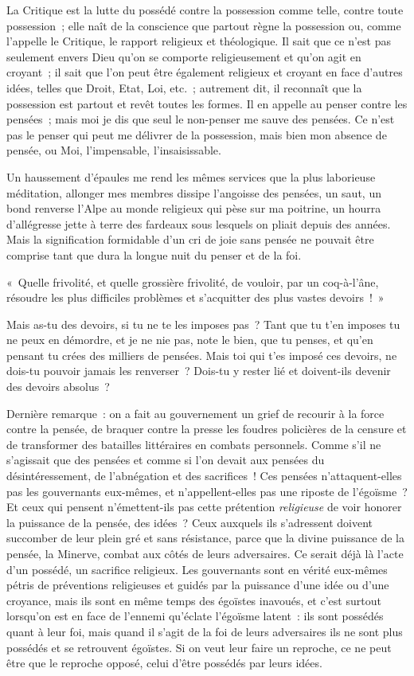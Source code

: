 \documentclass[french,twoside]{book} %
\begin{document}
La Critique est la lutte du possédé contre la possession comme telle, contre toute possession ; elle naît de la conscience que partout règne la possession ou, comme l’appelle le Critique, le rapport religieux et théologique. Il sait que ce n’est pas seulement envers Dieu qu’on se comporte religieusement et qu’on agit en croyant ; il sait que l’on peut être également religieux et croyant en face d’autres idées, telles que Droit, Etat, Loi, etc. ; autrement dit, il reconnaît que la possession est partout et revêt toutes les formes. Il en appelle au penser contre les pensées ; mais moi je dis que seul le non-penser me sauve des pensées. Ce n’est pas le penser qui peut me délivrer de la possession, mais bien mon absence de pensée, ou Moi, l’impensable, l’insaisissable.\par
Un haussement d’épaules me rend les mêmes services que la plus laborieuse méditation, allonger mes membres dissipe l’angoisse des pensées, un saut, un bond renverse l’Alpe au monde religieux qui pèse sur ma poitrine, un hourra d’allégresse jette à terre des fardeaux sous lesquels on pliait depuis des années. Mais la signification formidable d’un cri de joie sans pensée ne pouvait être comprise tant que dura la longue nuit du penser et de la foi.\par
« Quelle frivolité, et quelle grossière frivolité, de vouloir, par un coq-à-l’âne, résoudre les plus difficiles problèmes et s’acquitter des plus vastes devoirs ! »\par
Mais as-tu des devoirs, si tu ne te les imposes pas ? Tant que tu t’en imposes tu ne peux en démordre, et  je ne nie pas, note le bien, que tu penses, et qu’en pensant tu crées des milliers de pensées. Mais toi qui t’es imposé ces devoirs, ne dois-tu pouvoir jamais les renverser ? Dois-tu y rester lié et doivent-ils devenir des devoirs absolus ?\par
Dernière remarque : on a fait au gouvernement un grief de recourir à la force contre la pensée, de braquer contre la presse les foudres policières de la censure et de transformer des batailles littéraires en combats personnels. Comme s’il ne s’agissait que des pensées et comme si l’on devait aux pensées du désintéressement, de l’abnégation et des sacrifices ! Ces pensées n’attaquent-elles pas les gouvernants eux-mêmes, et n’appellent-elles pas une riposte de l’égoïsme ? Et ceux qui pensent n’émettent-ils pas cette prétention \emph{religieuse} de voir honorer la puissance de la pensée, des idées ? Ceux auxquels ils s’adressent doivent succomber de leur plein gré et sans résistance, parce que la divine puissance de la pensée, la Minerve, combat aux côtés de leurs adversaires. Ce serait déjà là l’acte d’un possédé, un sacrifice religieux. Les gouvernants sont en vérité eux-mêmes pétris de préventions religieuses et guidés par la puissance d’une idée ou d’une croyance, mais ils sont en même temps des égoïstes inavoués, et c’est surtout lorsqu’on est en face de l’ennemi qu’éclate l’égoïsme latent : ils sont possédés quant à leur foi, mais quand il s’agit de la foi de leurs adversaires ils ne sont plus possédés et se retrouvent égoïstes. Si on veut leur faire un reproche, ce ne peut être que le reproche opposé, celui d’être possédés par leurs idées.\par
\end{document}
